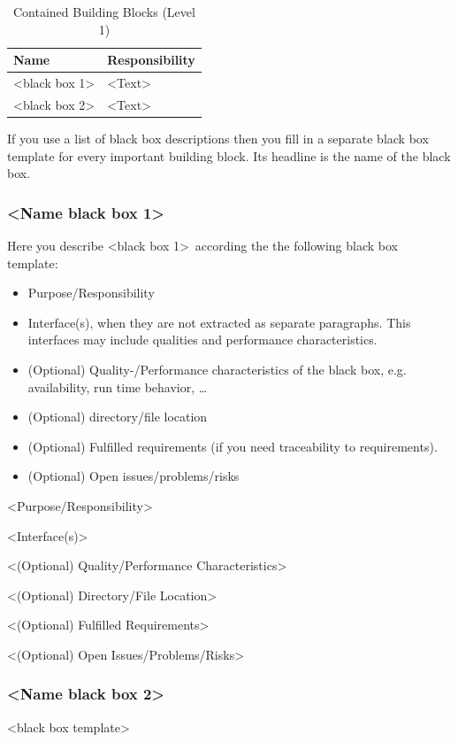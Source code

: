 \begin{table}[H]
\centering
\begin{tabular}{p{4cm} p{9cm}}
\toprule
Name & Responsibility \\
\midrule
\textless black box 1\textgreater & \textless Text\textgreater \\
\textless black box 2\textgreater & \textless Text\textgreater \\
\bottomrule
\end{tabular}
\caption{Contained Building Blocks (Level 1)}
\end{table}
If you use a list of black box descriptions then you fill in a separate black box template for every important building block. Its headline is the name of the black box.

\subsubsection{\textless Name black box 1\textgreater}

Here you describe \textless black box 1\textgreater\ according the the following black box template:
\begin{itemize}
  \item Purpose/Responsibility
  \item Interface(s), when they are not extracted as separate paragraphs. This interfaces may include qualities and performance characteristics.
  \item (Optional) Quality-/Performance characteristics of the black box, e.g. availability, run time behavior, \dots
  \item (Optional) directory/file location
  \item (Optional) Fulfilled requirements (if you need traceability to requirements).
  \item (Optional) Open issues/problems/risks
\end{itemize}

\textless Purpose/Responsibility\textgreater

\textless Interface(s)\textgreater

\textless (Optional) Quality/Performance Characteristics\textgreater

\textless (Optional) Directory/File Location\textgreater

\textless (Optional) Fulfilled Requirements\textgreater

\textless (Optional) Open Issues/Problems/Risks\textgreater

\subsubsection{\textless Name black box 2\textgreater}
\textless black box template\textgreater


